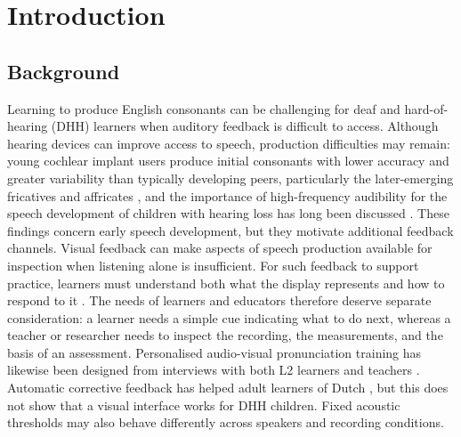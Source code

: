 \documentclass[engproc,article,submit,moreauthors]{Definitions/mdpi}
\begin{document}
\section{Introduction}
\subsection{Background}
Learning to produce English consonants can be challenging for deaf and hard-of-hearing (DHH) learners when auditory feedback is difficult to access. Although hearing devices can improve access to speech, production difficulties may remain: young cochlear implant users produce initial consonants with lower accuracy and greater variability than typically developing peers, particularly the later-emerging fricatives and affricates \cite{ertmer2011}, and the importance of high-frequency audibility for the speech development of children with hearing loss has long been discussed \cite{stelmachowicz2004}. These findings concern early speech development, but they motivate additional feedback channels. Visual feedback can make aspects of speech production available for inspection when listening alone is insufficient. For such feedback to support practice, learners must understand both what the display represents and how to respond to it \cite{hitchcock2023}. The needs of learners and educators therefore deserve separate consideration: a learner needs a simple cue indicating what to do next, whereas a teacher or researcher needs to inspect the recording, the measurements, and the basis of an assessment. Personalised audio-visual pronunciation training has likewise been designed from interviews with both L2 learners and teachers \cite{bu2021}. Automatic corrective feedback has helped adult learners of Dutch \cite{neri2006}, but this does not show that a visual interface works for DHH children. Fixed acoustic thresholds may also behave differently across speakers and recording conditions.
\end{document}
